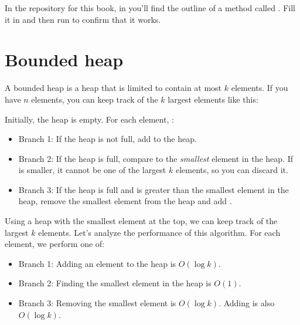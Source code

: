 \documentclass[12pt]{book}
\theoremstyle{exercise}
\begin{document}
In the repository for this book, in  you'll find
the outline of a method called . Fill it in and then
run  to confirm that it works.


\section{Bounded heap}
\label{bounded-heap}


A bounded heap is a heap that is limited to contain at most $k$
elements. If you have $n$ elements, you can keep track of the
$k$ largest elements like this:

Initially, the heap is empty.  For each element, :

\begin{itemize}

\item
  Branch 1: If the heap is not full, add  to the heap.

\item
  Branch 2: If the heap is full, compare  to the
  \emph{smallest} element in the heap. If  is smaller, it
  cannot be one of the largest $k$ elements, so you can discard
  it.

\item
  Branch 3: If the heap is full and  is greater than the
  smallest element in the heap, remove the smallest element from the
  heap and add .

\end{itemize}


Using a heap with the smallest element at the top, we can keep track of
the largest $k$ elements. Let's analyze the performance of this
algorithm. For each element, we perform one of:

\begin{itemize}

\item
  Branch 1: Adding an element to the heap is $O(\log k)$.

\item
  Branch 2: Finding the smallest element in the heap is $O(1)$.

\item
  Branch 3: Removing the smallest element is $O(\log k)$. Adding
   is also $O(\log k)$.

\end{itemize}
\end{document}
